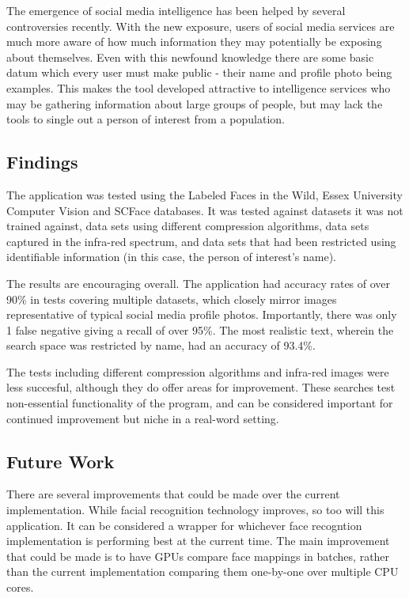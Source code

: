 \documentclass[12pt]{article}
\begin{document}
The emergence of social media intelligence has been helped by several controversies recently. With the new exposure, users of social media services are much more aware of how much information they may potentially be exposing about themselves. Even with this newfound knowledge there are some basic datum which every user must make public - their name and profile photo being examples. This makes the tool developed attractive to intelligence services who may be gathering information about large groups of people, but may lack the tools to single out a person of interest from a population.

\subsection{Findings}
The application was tested using the Labeled Faces in the Wild, Essex University Computer Vision and SCFace databases. It was tested against datasets it was not trained against, data sets using different compression algorithms, data sets captured in the infra-red spectrum, and data sets that had been restricted using identifiable information (in this case, the person of interest's name). 

The results are encouraging overall. The application had accuracy rates of over 90\% in tests covering multiple datasets, which closely mirror images representative of typical social media profile photos. Importantly, there was only 1 false negative giving a recall of over 95\%. The most realistic text, wherein the search space was restricted by name, had an accuracy of 93.4\%.

The tests including different compression algorithms and infra-red images were less succesful, although they do offer areas for improvement. These searches test non-essential functionality of the program, and can be considered important for continued improvement but niche in a real-word setting.

\subsection{Future Work}
There are several improvements that could be made over the current implementation. While facial recognition technology improves, so too will this application. It can be considered a wrapper for whichever face recogntion implementation is performing best at the current time. The main improvement that could be made is to have GPUs compare face mappings in batches, rather than the current implementation comparing them one-by-one over multiple CPU cores.
\end{document}
